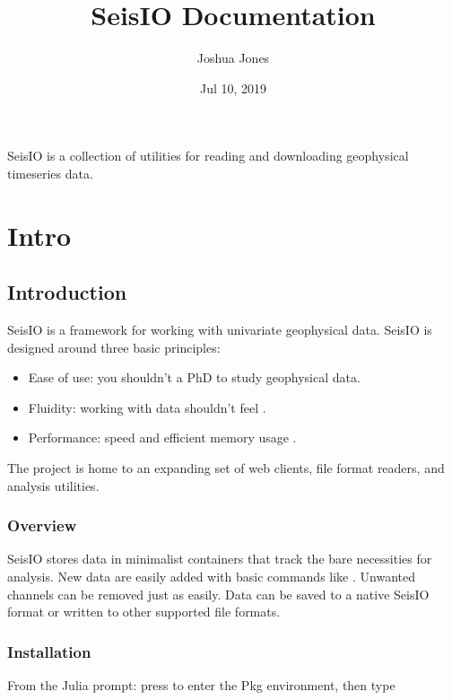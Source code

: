 \documentclass[letterpaper,11pt,english]{sphinxmanual}
\title{SeisIO Documentation}
\date{Jul 10, 2019}
\author{Joshua Jones}
\begin{document}
\pagestyle{empty}
\sphinxmaketitle
\pagestyle{plain}
\sphinxtableofcontents
\pagestyle{normal}
\label{\detokenize{index::doc}}


SeisIO is a collection of utilities for reading and downloading geophysical timeseries data.


\chapter{Intro}
\label{\detokenize{index:intro}}

\section{Introduction}
\label{\detokenize{src/intro:introduction}}\label{\detokenize{src/intro::doc}}
SeisIO is a framework for working with univariate geophysical data.
SeisIO is designed around three basic principles:
\begin{itemize}
\item {} 
Ease of use: you shouldn’t  a PhD to study geophysical data.

\item {} 
Fluidity: working with data shouldn’t feel .

\item {} 
Performance: speed and efficient memory usage .

\end{itemize}

The project is home to an expanding set of web clients, file format readers,
and analysis utilities.


\subsection{Overview}
\label{\detokenize{src/intro:overview}}
SeisIO stores data in minimalist containers that track the bare necessities for
analysis. New data are easily added with basic commands like \sphinxcode{\sphinxupquote{+}}. Unwanted
channels can be removed just as easily. Data can be saved to a native SeisIO
format or written to other supported file formats.


\subsection{Installation}
\label{\detokenize{src/intro:installation}}
From the Julia prompt: press \sphinxcode{\sphinxupquote{{]}}} to enter the Pkg environment, then type
\end{document}
